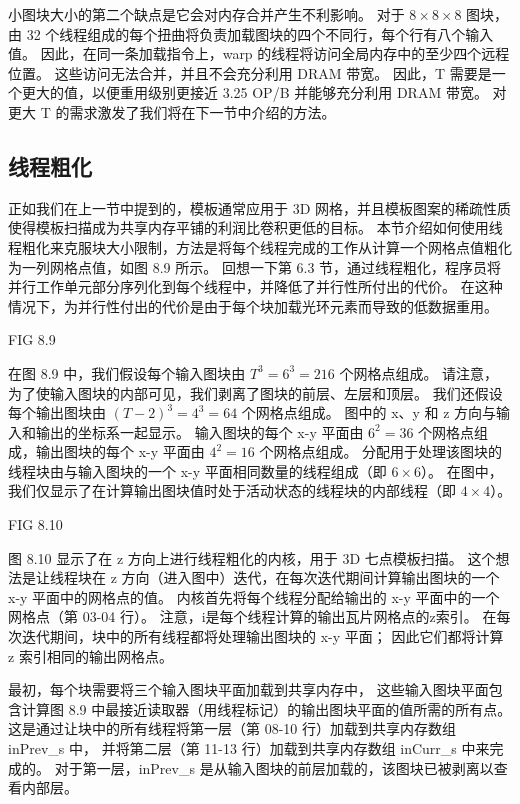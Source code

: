 小图块大小的第二个缺点是它会对内存合并产生不利影响。 
对于 $8 \times 8 \times 8$ 图块，由 32 个线程组成的每个扭曲将负责加载图块的四个不同行，每个行有八个输入值。 
因此，在同一条加载指令上，warp 的线程将访问全局内存中的至少四个远程位置。 这些访问无法合并，并且不会充分利用 DRAM 带宽。 
因此，T 需要是一个更大的值，以便重用级别更接近 3.25 OP/B 并能够充分利用 DRAM 带宽。 
对更大 T 的需求激发了我们将在下一节中介绍的方法。

\subsection{线程粗化}
正如我们在上一节中提到的，模板通常应用于 3D 网格，并且模板图案的稀疏性质使得模板扫描成为共享内存平铺的利润比卷积更低的目标。 
本节介绍如何使用线程粗化来克服块大小限制，方法是将每个线程完成的工作从计算一个网格点值粗化为一列网格点值，如图 8.9 所示。 
回想一下第 6.3 节，通过线程粗化，程序员将并行工作单元部分序列化到每个线程中，并降低了并行性所付出的代价。 
在这种情况下，为并行性付出的代价是由于每个块加载光环元素而导致的低数据重用。

{\color{red} FIG 8.9}

在图 8.9 中，我们假设每个输入图块由 $T^3 = 6^3 = 216$ 个网格点组成。 
请注意，为了使输入图块的内部可见，我们剥离了图块的前层、左层和顶层。 
我们还假设每个输出图块由 $(T-2)^3 = 4^3 = 64$ 个网格点组成。 图中的 x、y 和 z 方向与输入和输出的坐标系一起显示。 
输入图块的每个 x-y 平面由 $6^2 = 36$ 个网格点组成，输出图块的每个 x-y 平面由 $4^2 = 16$ 个网格点组成。 
分配用于处理该图块的线程块由与输入图块的一个 x-y 平面相同数量的线程组成（即 $6 \times 6$）。 
在图中，我们仅显示了在计算输出图块值时处于活动状态的线程块的内部线程（即 $4 \times 4$）。

{\color{red} FIG 8.10}

图 8.10 显示了在 z 方向上进行线程粗化的内核，用于 3D 七点模板扫描。 
这个想法是让线程块在 z 方向（进入图中）迭代，在每次迭代期间计算输出图块的一个 x-y 平面中的网格点的值。 
内核首先将每个线程分配给输出的 x-y 平面中的一个网格点（第 03-04 行）。 注意，i是每个线程计算的输出瓦片网格点的z索引。 
在每次迭代期间，块中的所有线程都将处理输出图块的 x-y 平面； 因此它们都将计算 z 索引相同的输出网格点。

最初，每个块需要将三个输入图块平面加载到共享内存中，
这些输入图块平面包含计算图 8.9 中最接近读取器（用线程标记）的输出图块平面的值所需的所有点。 
这是通过让块中的所有线程将第一层（第 08-10 行）加载到共享内存数组 inPrev\_s 中，
并将第二层（第 11-13 行）加载到共享内存数组 inCurr\_s 中来完成的。 
对于第一层，inPrev\_s 是从输入图块的前层加载的，该图块已被剥离以查看内部层。

